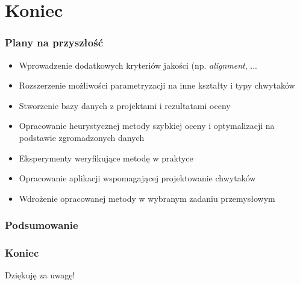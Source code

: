 \documentclass[12pt,a4paper,portrait]{beamer}
\begin{document}
\section{Koniec}
\begin{frame}
\frametitle{Plany na przyszłość}
\begin{itemize}
\item Wprowadzenie dodatkowych kryteriów jakości (np. \textit{alignment}, ...
\item Rozszerzenie możliwości parametryzacji na inne kształty i typy chwytaków
\item Stworzenie bazy danych z projektami i rezultatami oceny
\item Opracowanie heurystycznej metody szybkiej oceny i optymalizacji na podstawie zgromadzonych danych
\item Eksperymenty weryfikujące metodę w praktyce
\item Opracowanie aplikacji wspomagającej projektowanie chwytaków
\item Wdrożenie opracowanej metody w wybranym zadaniu przemysłowym
\end{itemize}
\end{frame}

\begin{frame}
\frametitle{Podsumowanie}
\end{frame}

\begin{frame}
\frametitle{Koniec}
Dziękuję za uwagę!
\end{frame}
\end{document}
